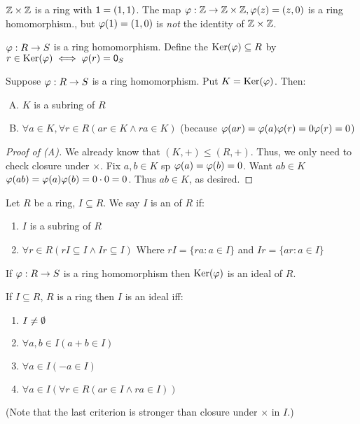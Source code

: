 \documentclass[notes.tex]{subfiles}
\begin{document}
\begin{eg}
	$\mathbb{Z}\times\mathbb{Z}$ is a ring with $\mathsf{1}=(1, 1)$.
	The map $\varphi:\mathbb{Z}\to\mathbb{Z}\times\mathbb{Z}, \varphi(z) = (z, 0)$ is a ring homomorphism., but $\varphi(1) = (1, 0)$ is \emph{not} the identity of $\mathbb{Z}\times\mathbb{Z}$.
\end{eg}

\begin{defn}
	$\varphi:R\to S$ is a ring homomorphism. Define the  $\operatorname{\mathrm{Ker}}(\varphi)\subseteq R$ by $r\in \operatorname{\mathrm{Ker}}(\varphi) \iff \varphi(r) = \mathsf{0}_S$
\end{defn}

\begin{proposition}
	Suppose $\varphi:R\to S$ is a ring homomorphism. Put $K=\operatorname{\mathrm{Ker}}(\varphi)$. Then:
	\begin{enumerate}[(A)]
		\item $K$ is a subring of $R$
		\item $\forall a\in K, \forall r\in R (ar\in K \land ra\in K)$ (because $\varphi(ar) = \varphi(a)\varphi(r) = 0\varphi(r) = 0$)
	\end{enumerate}
\end{proposition}
\begin{proof}[Proof of (A)]
	We already know that $(K, +) \le (R, +)$. Thus, we only need to check closure under $\times$.
	Fix $a, b\in K$ sp $\varphi(a) = \varphi(b) = 0$. Want $ab\in K$ $\varphi(ab) = \varphi(a)\varphi(b) = 0\cdot 0 = 0$. Thus $ab\in K$, as desired.
\end{proof}

\begin{defn}
	Let $R$ be a ring, $I\subseteq R$. We say $I$ is an  of $R$ if:
	\begin{enumerate}
		\item $I$ is a subring of $R$
		\item $\forall r\in R (rI\subseteq I \land Ir \subseteq I)$
		Where $rI = \{ra : a\in I\}$ and $Ir = \{ar: a\in I\}$
	\end{enumerate}
\end{defn}

\begin{proposition}
	If $\varphi:R\to S$ is a ring homomorphism then $\operatorname{\mathrm{Ker}}(\varphi)$ is an ideal of $R$.
\end{proposition}

\begin{proposition}
	\label{idealcrit}
	If $I\subseteq R$, $R$ is a ring then $I$ is an ideal iff:
	\begin{enumerate}
		\item $I\ne \emptyset$
		\item $\forall a, b\in I (a+b\in I)$
		\item $\forall a\in I (-a\in I)$
		\item $\forall a\in I (\forall r\in R (ar\in I \land ra \in I))$
	\end{enumerate}
\end{proposition}
(Note that the last criterion is stronger than closure under $\times$ in $I$.)
\end{document}
